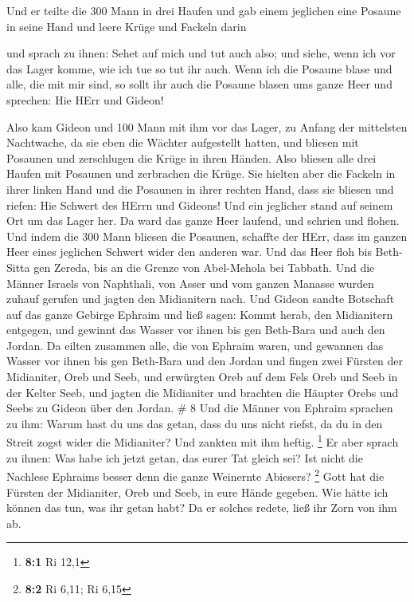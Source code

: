  Und er teilte die 300 Mann in drei Haufen und gab einem
jeglichen eine Posaune in seine Hand und leere Krüge und Fackeln darin

 und sprach zu ihnen: Sehet auf mich und tut auch also; und
siehe, wenn ich vor das Lager komme, wie ich tue so tut ihr auch.
 Wenn ich die Posaune blase und alle, die mit mir sind, so
sollt ihr auch die Posaune blasen ums ganze Heer und sprechen: Hie HErr
und Gideon!

 Also kam Gideon und 100 Mann mit ihm vor das Lager, zu
Anfang der mittelsten Nachtwache, da sie eben die Wächter aufgestellt
hatten, und bliesen mit Posaunen und zerschlugen die Krüge in ihren
Händen.  Also bliesen alle drei Haufen mit Posaunen und
zerbrachen die Krüge. Sie hielten aber die Fackeln in ihrer linken Hand
und die Posaunen in ihrer rechten Hand, dass sie bliesen und riefen: Hie
Schwert des HErrn und Gideons!  Und ein jeglicher stand auf
seinem Ort um das Lager her. Da ward das ganze Heer laufend, und schrien
und flohen.  Und indem die 300 Mann bliesen die Posaunen,
schaffte der HErr, dass im ganzen Heer eines jeglichen Schwert wider den
anderen war. Und das Heer floh bis Beth-Sitta gen Zereda, bis an die
Grenze von Abel-Mehola bei Tabbath.  Und die Männer Israels
von Naphthali, von Asser und vom ganzen Manasse wurden zuhauf gerufen
und jagten den Midianitern nach.  Und Gideon sandte
Botschaft auf das ganze Gebirge Ephraim und ließ sagen: Kommt herab, den
Midianitern entgegen, und gewinnt das Wasser vor ihnen bis gen Beth-Bara
und auch den Jordan. Da eilten zusammen alle, die von Ephraim waren, und
gewannen das Wasser vor ihnen bis gen Beth-Bara und den Jordan
 und fingen zwei Fürsten der Midianiter, Oreb und Seeb, und
erwürgten Oreb auf dem Fels Oreb und Seeb in der Kelter Seeb, und jagten
die Midianiter und brachten die Häupter Orebs und Seebs zu Gideon über
den Jordan. \# 8  Und die Männer von Ephraim sprachen zu
ihm: Warum hast du uns das getan, dass du uns nicht riefst, da du in den
Streit zogst wider die Midianiter? Und zankten mit ihm heftig.
\footnote{\textbf{8:1} Ri 12,1}  Er aber sprach zu ihnen:
Was habe ich jetzt getan, das eurer Tat gleich sei? Ist nicht die
Nachlese Ephraims besser denn die ganze Weinernte Abiesers? \footnote{\textbf{8:2}
  Ri 6,11; Ri 6,15}  Gott hat die Fürsten der Midianiter,
Oreb und Seeb, in eure Hände gegeben. Wie hätte ich können das tun, was
ihr getan habt? Da er solches redete, ließ ihr Zorn von ihm ab.


